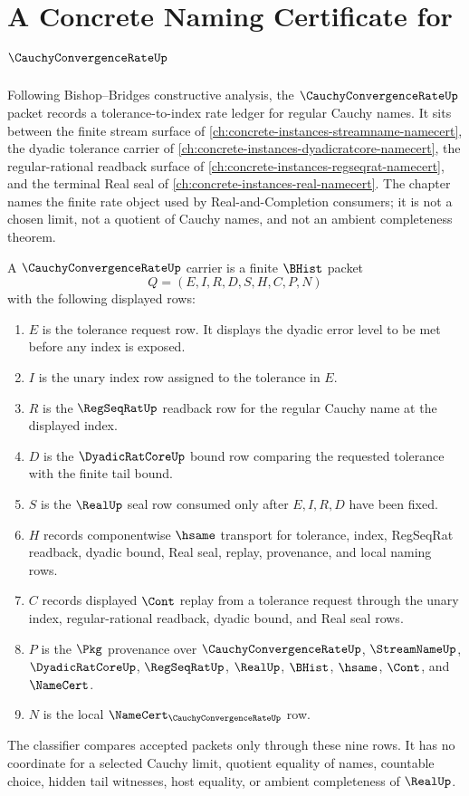 \chapter{A Concrete Naming Certificate for $\CauchyConvergenceRateUp$}
\label{ch:concrete-instances-cauchy-convergence-rate-namecert}

Following Bishop--Bridges constructive analysis, the $\CauchyConvergenceRateUp$ packet records a tolerance-to-index rate ledger for regular Cauchy names. It sits between the finite stream surface of \autoref{ch:concrete-instances-streamname-namecert}, the dyadic tolerance carrier of \autoref{ch:concrete-instances-dyadicratcore-namecert}, the regular-rational readback surface of \autoref{ch:concrete-instances-regseqrat-namecert}, and the terminal Real seal of \autoref{ch:concrete-instances-real-namecert}. The chapter names the finite rate object used by Real-and-Completion consumers; it is not a chosen limit, not a quotient of Cauchy names, and not an ambient completeness theorem.

\begin{definition}
\label{def:cauchy-convergence-rate-carrier}
A $\CauchyConvergenceRateUp$ carrier is a finite $\BHist$ packet
$$
Q=(E,I,R,D,S,H,C,P,N)
$$
with the following displayed rows:
\begin{enumerate}
\item $E$ is the tolerance request row. It displays the dyadic error level to be met before any index is exposed.
\item $I$ is the unary index row assigned to the tolerance in $E$.
\item $R$ is the $\RegSeqRatUp$ readback row for the regular Cauchy name at the displayed index.
\item $D$ is the $\DyadicRatCoreUp$ bound row comparing the requested tolerance with the finite tail bound.
\item $S$ is the $\RealUp$ seal row consumed only after $E,I,R,D$ have been fixed.
\item $H$ records componentwise $\hsame$ transport for tolerance, index, RegSeqRat readback, dyadic bound, Real seal, replay, provenance, and local naming rows.
\item $C$ records displayed $\Cont$ replay from a tolerance request through the unary index, regular-rational readback, dyadic bound, and Real seal rows.
\item $P$ is the $\Pkg$ provenance over $\CauchyConvergenceRateUp$, $\StreamNameUp$, $\DyadicRatCoreUp$, $\RegSeqRatUp$, $\RealUp$, $\BHist$, $\hsame$, $\Cont$, and $\NameCert$.
\item $N$ is the local $\NameCert_{\CauchyConvergenceRateUp}$ row.
\end{enumerate}
The classifier compares accepted packets only through these nine rows. It has no coordinate for a selected Cauchy limit, quotient equality of names, countable choice, hidden tail witnesses, host equality, or ambient completeness of $\RealUp$.
\end{definition}

